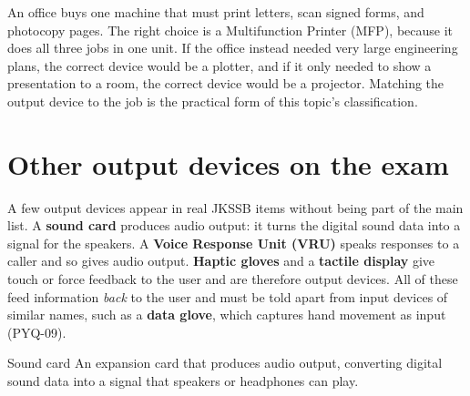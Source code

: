 \begin{example}
An office buys one machine that must print letters, scan signed forms, and
photocopy pages. The right choice is a Multifunction Printer (MFP), because it
does all three jobs in one unit. If the office instead needed very large
engineering plans, the correct device would be a plotter, and if it only
needed to show a presentation to a room, the correct device would be a
projector. Matching the output device to the job is the practical form of this
topic's classification.
\end{example}

\section{Other output devices on the exam}
A few output devices appear in real JKSSB items without being part of the
main list. A \textbf{sound card} produces audio output: it turns the digital
sound data into a signal for the speakers. A \textbf{Voice Response Unit
(VRU)} speaks responses to a caller and so gives audio output. \textbf{Haptic
gloves} and a \textbf{tactile display} give touch or force feedback to the
user and are therefore output devices. All of these feed information
\emph{back} to the user and must be told apart from input devices of similar
names, such as a \textbf{data glove}, which captures hand movement as input
(PYQ-09).

\begin{definitionbox}{Sound card}
An expansion card that produces audio output, converting digital sound data
into a signal that speakers or headphones can play.
\end{definitionbox}

